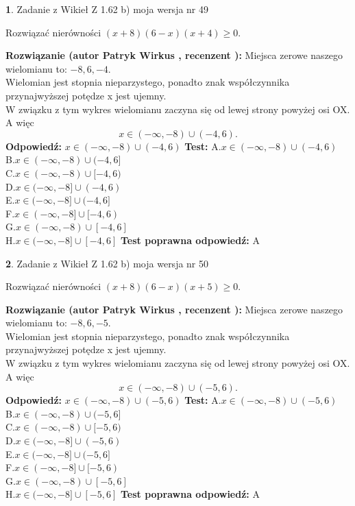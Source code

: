 \documentclass[12pt, a4paper]{article}
\theoremstyle{definition} %
\newtheorem{zad}{}
\newcommand{\zadStart}[1]{\begin{zad}#1\newline}
\newcommand{\zadStop}{\end{zad}}
\newcommand{\rozwStart}[2]{\noindent \textbf{Rozwiązanie (autor #1 , recenzent #2): }\newline}
\newcommand{\rozwStop}{\newline}
\newcommand{\odpStart}{\noindent \textbf{Odpowiedź:}\newline}
\newcommand{\odpStop}{\newline}
\newcommand{\testStart}{\noindent \textbf{Test:}\newline}
\newcommand{\testStop}{\newline}
\newcommand{\kluczStart}{\noindent \textbf{Test poprawna odpowiedź:}\newline}
\newcommand{\kluczStop}{\newline}
\begin{document}
\zadStart{Zadanie z Wikieł Z 1.62 b) moja wersja nr 49}

Rozwiązać nierówności $(x+8)(6-x)(x+4)\ge0$.
\zadStop
\rozwStart{Patryk Wirkus}{}
Miejsca zerowe naszego wielomianu to: $-8, 6, -4$.\\
Wielomian jest stopnia nieparzystego, ponadto znak współczynnika przy\linebreak najwyższej potędze x jest ujemny.\\ W związku z tym wykres wielomianu zaczyna się od lewej strony powyżej osi OX. A więc $$x \in (-\infty,-8) \cup (-4,6).$$
\rozwStop
\odpStart
$x \in (-\infty,-8) \cup (-4,6)$
\odpStop
\testStart
A.$x \in (-\infty,-8) \cup (-4,6)$\\
B.$x \in (-\infty,-8) \cup (-4,6]$\\
C.$x \in (-\infty,-8) \cup [-4,6)$\\
D.$x \in (-\infty,-8] \cup (-4,6)$\\
E.$x \in (-\infty,-8] \cup (-4,6]$\\
F.$x \in (-\infty,-8] \cup [-4,6)$\\
G.$x \in (-\infty,-8) \cup [-4,6]$\\
H.$x \in (-\infty,-8] \cup [-4,6]$
\testStop
\kluczStart
A
\kluczStop



\zadStart{Zadanie z Wikieł Z 1.62 b) moja wersja nr 50}

Rozwiązać nierówności $(x+8)(6-x)(x+5)\ge0$.
\zadStop
\rozwStart{Patryk Wirkus}{}
Miejsca zerowe naszego wielomianu to: $-8, 6, -5$.\\
Wielomian jest stopnia nieparzystego, ponadto znak współczynnika przy\linebreak najwyższej potędze x jest ujemny.\\ W związku z tym wykres wielomianu zaczyna się od lewej strony powyżej osi OX. A więc $$x \in (-\infty,-8) \cup (-5,6).$$
\rozwStop
\odpStart
$x \in (-\infty,-8) \cup (-5,6)$
\odpStop
\testStart
A.$x \in (-\infty,-8) \cup (-5,6)$\\
B.$x \in (-\infty,-8) \cup (-5,6]$\\
C.$x \in (-\infty,-8) \cup [-5,6)$\\
D.$x \in (-\infty,-8] \cup (-5,6)$\\
E.$x \in (-\infty,-8] \cup (-5,6]$\\
F.$x \in (-\infty,-8] \cup [-5,6)$\\
G.$x \in (-\infty,-8) \cup [-5,6]$\\
H.$x \in (-\infty,-8] \cup [-5,6]$
\testStop
\kluczStart
A
\kluczStop
\end{document}
